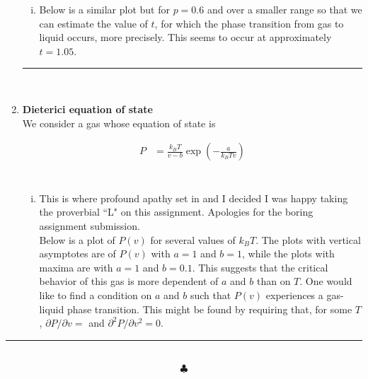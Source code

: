 \documentclass[]{article}
\begin{document}
\begin{enumerate}[1.]
\begin{enumerate}[i.]


\item Below is a similar plot but for $p=0.6$ and over a smaller range so that we can estimate the value of $t$, for which the phase transition from gas to liquid occurs, more precisely. This seems to occur at approximately $t = 1.05$. 




\end{enumerate}

\noindent\rule{15cm}{0.4pt} \\

\item {\bf Dieterici equation of state} \\

We consider a gas whose equation of state is

\begin{equation}
\begin{aligned}
P & = \frac{  k_B T }{ v- b } \exp(  - \frac{ a }{ k_B T v } ) \\
\end{aligned}
\end{equation} \\

\begin{enumerate}[i.]

\item This is where profound apathy set in and I decided I was happy taking the proverbial ``L" on this assignment. Apologies for the boring assignment submission. \\

Below is a plot of $P(v)$ for several values of $k_B T$. The plots with vertical asymptotes are of $P(v)$ with $a = 1$ and $b = 1$, while the plots with maxima are with $a = 1$ and $b = 0.1$. This suggests that the critical behavior of this gas is more dependent of $a$ and $b$ than on $T$. One would like to find a condition on $a$ and $b$ such that $P(v)$ experiences a gas-liquid phase transition. This might be found by requiring that, for some $T$, $\partial P/ \partial v = $ and $\partial^2 P/ \partial v^2 = 0$. 















\end{enumerate}





\newpage




\end{enumerate}


 
\noindent\rule{15cm}{0.4pt} \\

$$\clubsuit$$
\end{document}

